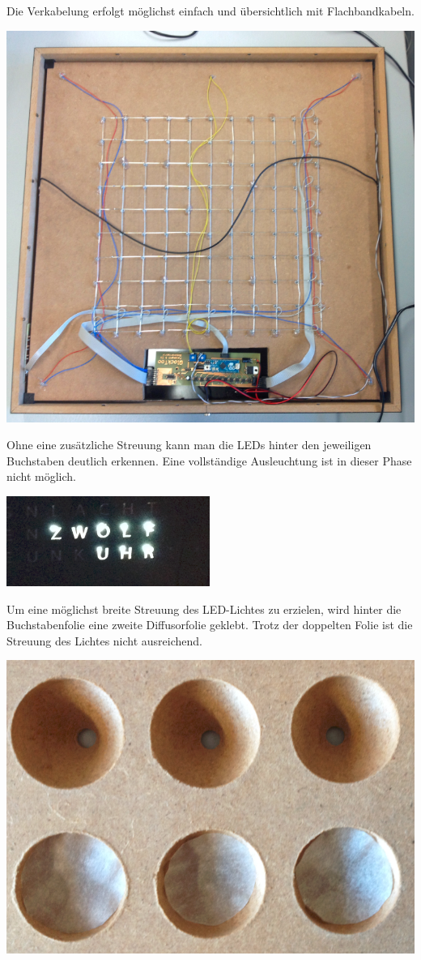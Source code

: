 \begin{multicols}{2}
{}
Die Verkabelung erfolgt möglichst einfach und übersichtlich mit Flachbandkabeln. 

{
\centering\includegraphics[width=0.85\columnwidth]{Abbildungen/Konstruktion/Platte04}

}

Ohne eine zusätzliche Streuung kann man die LEDs hinter den jeweiligen Buchstaben deutlich erkennen. Eine vollständige Ausleuchtung ist in dieser Phase nicht möglich. 

{
\centering\includegraphics[width=0.85\columnwidth]{Abbildungen/Konstruktion/LED03}

}
Um eine möglichst breite Streuung des LED-Lichtes zu erzielen, wird hinter die Buchstabenfolie eine zweite Diffusorfolie  geklebt. Trotz der doppelten Folie ist die Streuung des Lichtes nicht ausreichend. 

{
\centering\includegraphics[width=0.5\columnwidth]{Abbildungen/Konstruktion/Diffusor01}

}
\end{multicols}
